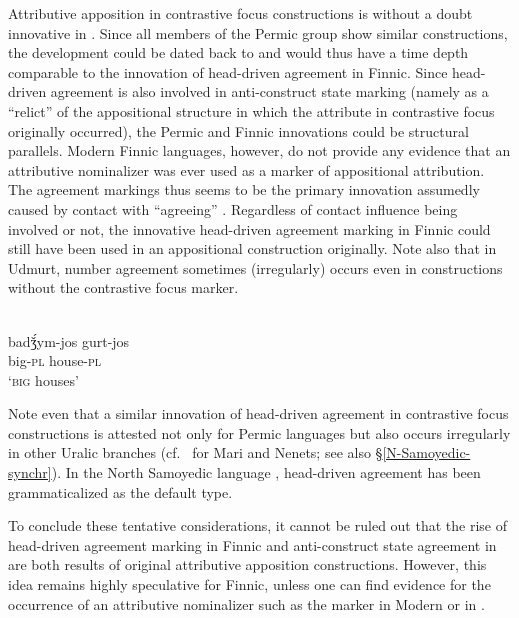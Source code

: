 {
Attributive apposition in contrastive focus constructions is without a doubt innovative in . Since all members of the Permic group show similar constructions, the development could be dated back to  and would thus have a time depth comparable to the innovation of head\hyp{}driven agreement in Finnic. Since head\hyp{}driven agreement is also involved in  anti\hyp{}construct state marking (namely as a “relict” of the appositional structure in which the attribute in contrastive focus originally occurred), the Permic and Finnic innovations could be structural parallels. Modern Finnic languages, however, do not provide any evidence that an attributive nominalizer was ever used as a marker of appositional attribution. The agreement markings thus seems to be the primary innovation assumedly caused by contact with “agreeing” . Regardless of contact influence being involved or not, the innovative head\hyp{}driven agreement marking in Finnic could still have been used in an appositional construction originally. Note also that in Udmurt, number agreement sometimes (irregularly) occurs even in constructions without the contrastive focus marker.
\begin{exe}
\\
\gll	badǯ́ym-jos gurt-jos\\
	big-\textsc{pl} house-\textsc{pl}\\
\glt	‘\textsc{big} houses’
\end{exe}

Note even that a similar innovation of head\hyp{}driven agreement in contrastive focus constructions is attested not only for Permic languages but also occurs irregularly in other Uralic branches (cf.~\citealt[136–138, 142]{honti1997} for Mari and Nenets; see also \S\ref{N-Samoyedic-synchr}). In the North Samoyedic language , head\hyp{}driven agreement has been grammaticalized as the default type.

\largerpage
To conclude these tentative considerations, it cannot be ruled out that the rise of head\hyp{}driven agreement marking in Finnic and anti\hyp{}construct state agreement in  are both results of original attributive apposition constructions. However, this idea remains highly speculative for Finnic, unless one can find evidence for the occurrence of an attributive nominalizer such as the marker in Modern  or in .

}
